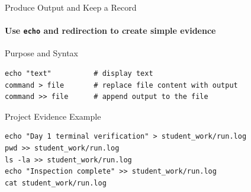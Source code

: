 \begin{frame}[fragile]{Produce Output and Keep a Record}
\framesubtitle{Use \texttt{echo} and redirection to create simple evidence}

\footnotesize

\begin{block}{Purpose and Syntax}
\begin{verbatim}
echo "text"          # display text
command > file       # replace file content with output
command >> file      # append output to the file
\end{verbatim}
\end{block}

\begin{exampleblock}{Project Evidence Example}
\begin{verbatim}
echo "Day 1 terminal verification" > student_work/run.log
pwd >> student_work/run.log
ls -la >> student_work/run.log
echo "Inspection complete" >> student_work/run.log
cat student_work/run.log
\end{verbatim}
\end{exampleblock}
\end{frame}


